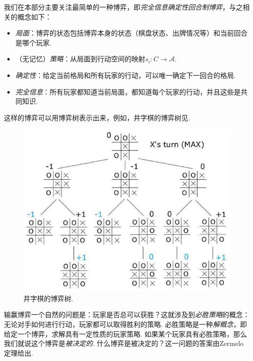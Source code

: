我们在本部分主要关注最简单的一种博弈，即\emph{完全信息确定性回合制博弈}，与之相关的概念如下：
\begin{itemize}
    \item \emph{局面}：博弈的状态包括博弈本身的状态（棋盘状态、出牌情况等）和当前回合是哪个玩家.
    \item （无记忆）\emph{策略}：从局面到行动空间的映射$s_i:C\to\mathcal A$.
    \item \emph{确定性}：给定当前格局和所有玩家的行动，可以唯一确定下一回合的格局.
    \item  \emph{完全信息}：所有玩家都知道当前局面，都知道每个玩家的行动，并且这些是共同知识.
\end{itemize}

这样的博弈可以用博弈树表示出来，例如，井字棋的博弈树见.

\begin{figure}
    \centering
    \includegraphics[scale=0.4]{Figures/dynamical-game/gametree.jpg}
    \caption{井字棋的博弈树.}
    \label{fig:gametree}
\end{figure}

输赢博弈一个自然的问题是：玩家是否总可以获胜？这就涉及到\emph{必胜策略}的概念：无论对手如何进行行动，玩家都可以取得胜利的策略. 必胜策略是一种\emph{解概念}，即给定一个博弈，求解具有一定性质的玩家策略. 如果某个玩家具有必胜策略，那么我们就说这个博弈是\emph{被决定的}. 什么博弈是被决定的？这一问题的答案由Zermelo定理给出.

